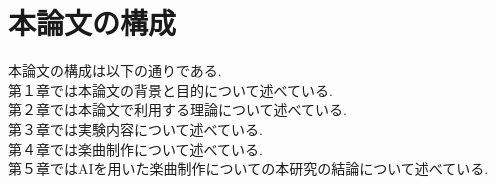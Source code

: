     \section{本論文の構成}
    本論文の構成は以下の通りである.\\
    第１章では本論文の背景と目的について述べている.\\
    第２章では本論文で利用する理論について述べている.\\
    第３章では実験内容について述べている.\\
    第４章では楽曲制作について述べている.\\
    第５章ではAIを用いた楽曲制作についての本研究の結論について述べている.\\    